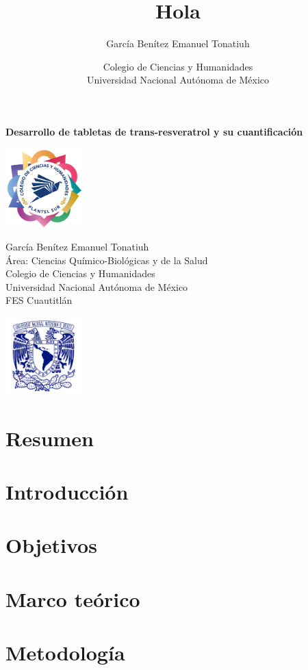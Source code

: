 \documentclass[11pt]{article}
\title{Hola}
\author{García Benítez Emanuel Tonatiuh}
\date{Colegio de Ciencias y Humanidades\\
        Universidad Nacional Autónoma de México}
\theoremstyle{mytheoremstyle}
\theoremstyle{mytheoremstyle}
\theoremstyle{myproblemstyle}
\begin{document}
\onehalfspacing

\begin{titlepage}
    \thispagestyle{empty}
    \begin{center}
        {\LARGE \textbf{Desarrollo de tabletas de trans-resveratrol y su cuantificación}}
    \end{center}
    \vspace{1cm}
    \noindent
    \begin{minipage}[c]{0.2\textwidth}
        \centering
        \includegraphics[width=3cm]{img/cch.png}
    \end{minipage}
    \hfill
    \begin{minipage}[c]{0.55\textwidth}
        \centering
        {\large García Benítez Emanuel Tonatiuh}\\[0.5cm]
        {\large Área: Ciencias Químico-Biológicas y de la Salud}\\[0.5cm]
        {\large Colegio de Ciencias y Humanidades}\\
        {\large Universidad Nacional Autónoma de México}\\
        {\large FES Cuautitlán}\\
    \end{minipage}
    \hfill
    \begin{minipage}[c]{0.2\textwidth}
        \centering
        \includegraphics[width=3.0cm]{img/UNAM.jpg}
    \end{minipage}
\end{titlepage}

\setcounter{page}{1} %

\section{Resumen}
    
\section{Introducción}
    

\section{Objetivos}
    

\section{Marco teórico}
    

\section{Metodología}
    

\printbibliography
\end{document}
